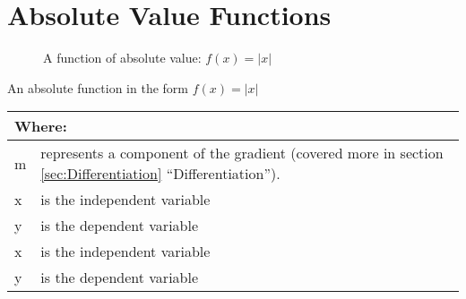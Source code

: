 \section{Absolute Value Functions}
\begin{figure}[!hbt]
\label{fig:FuncGraphAbsolute}
\caption{A function of absolute value: $f(x) = |x|$}
\end{figure}
An absolute function in the form $ f(x) = |x|$
\begin{table}[!hbt]
\label{tab:PartsOfAnAbsoluteFunction}
\begin{tabularx}{\linewidth}{| l X |}
  \hline
  \multicolumn{2}{|l|}{Where:} \\
  \hline \hline
  m & represents a component of the gradient (covered more in section
  \ref{sec:Differentiation} ``Differentiation''). \\ x & is the independent
  variable\\ y & is the dependent variable\\
  x & is the independent variable\\
  y & is the dependent variable\\
\hline
\end{tabularx}
\end{table}
\clearpage